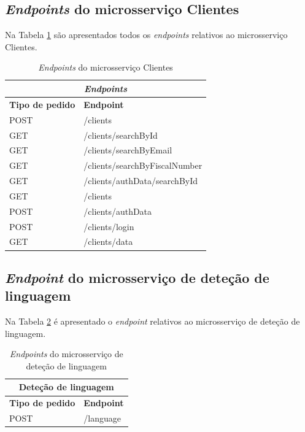 \subsection{\textit{Endpoints} do microsserviço Clientes}
Na Tabela \ref{table:endpoints6} são apresentados todos os \textit{endpoints} relativos ao microsserviço Clientes.

\begin{table}[H]
\caption{\textit{Endpoints} do microsserviço Clientes}
\label{table:endpoints6}
\begin{center}
\begin{tabular}{ |p{4cm}|p{6cm}|  }
\hline
\multicolumn{2}{|c|}{\textit{Endpoints}} \\
\hline
\textbf{Tipo de pedido} & \textbf{Endpoint}\\
\hline
POST & /clients \\
\hline
GET & /clients/searchById \\
\hline
GET & /clients/searchByEmail \\
\hline
GET & /clients/searchByFiscalNumber \\
\hline
GET & /clients/authData/searchById \\
\hline
GET & /clients \\
\hline
POST & /clients/authData \\
\hline
POST & /clients/login \\
\hline
GET & /clients/data\\
\hline
\end{tabular} 
\end{center}
\end{table}

\subsection{\textit{Endpoint} do microsserviço de deteção de linguagem}
Na Tabela \ref{table:endpoints7} é apresentado o \textit{endpoint} relativos ao microsserviço de deteção de linguagem.

\begin{table}[H]
\caption{\textit{Endpoints} do microsserviço de deteção de linguagem}
\label{table:endpoints7}
\begin{center}
\begin{tabular}{ |p{4cm}|p{6cm}|  }
\hline
\multicolumn{2}{|c|}{Deteção de linguagem} \\
\hline
\textbf{Tipo de pedido} & \textbf{Endpoint}\\
\hline
POST & /language \\
\hline
\end{tabular} 
\end{center}
\end{table}

